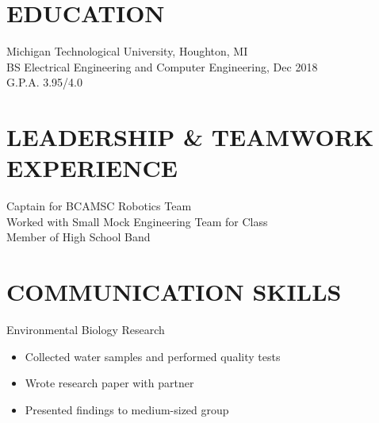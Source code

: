 \documentclass[letterpaper]{res}
\begin{document}
 


\address{\bf PERMANENT ADDRESS \\ 14200 Stone Jug Road \\  Battle Creek, MI 49015 \\  (269) 262-6098 \\ jaevanko@mtu.edu}
                                  
\begin{resume}

 
\section{EDUCATION}          
    Michigan Technological University, Houghton, MI  \\        
    BS Electrical Engineering and Computer Engineering, Dec 2018   \\      
    G.P.A. 3.95/4.0          

\section{LEADERSHIP \& TEAMWORK EXPERIENCE}
	Captain for BCAMSC Robotics Team \\
	Worked with Small Mock Engineering Team for Class \\
	Member of High School Band

\section{COMMUNICATION SKILLS}
	Environmental Biology Research
	\begin{itemize} \itemsep1pt \parskip0pt 
		\item Collected water samples and performed quality tests
		\item Wrote research paper with partner
		\item Presented findings to medium-sized group
	\end{itemize}


\end{resume}
\end{document}
